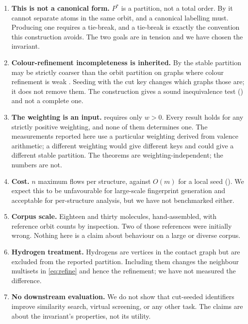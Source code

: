 \documentclass[11pt,twocolumn,a4paper]{article}
\theoremstyle{crthm}
\theoremstyle{definition}
\theoremstyle{remark}
\newcommand{\wt}{w}
\begin{document}
\begin{enumerate}[label=\textbf{L\arabic*.},leftmargin=2.8em,itemsep=4pt]

\item \textbf{This is not a canonical form.} $P^{*}$ is a partition, not a
total order. By  it cannot separate atoms in the
same orbit, and a canonical labelling must. Producing one requires a
tie-break, and a tie-break is exactly the convention this construction
avoids. The two goals are in tension and we have chosen the invariant.

\item \textbf{Colour-refinement incompleteness is inherited.} By
 the stable partition may be strictly coarser than
the orbit partition on graphs where colour refinement is weak
\citep{cai1992}. Seeding with the cut key changes which graphs those are;
it does not remove them. The construction gives a sound inequivalence test
() and not a complete one.

\item \textbf{The weighting is an input.}  requires only
$\wt>0$. Every result holds for any strictly positive weighting, and none
of them determines one. The measurements reported here use a particular
weighting derived from valence arithmetic; a different weighting would
give different keys and could give a different stable partition. The
theorems are weighting-independent; the numbers are not.

\item \textbf{Cost.} $n$ maximum flows per structure, against $O(m)$ for a
local seed (). We expect this to be unfavourable for
large-scale fingerprint generation and acceptable for per-structure
analysis, but we have not benchmarked either.

\item \textbf{Corpus scale.} Eighteen and thirty molecules, hand-assembled,
with reference orbit counts by inspection. Two of those references were
initially wrong. Nothing here is a claim about behaviour on a large or
diverse corpus.

\item \textbf{Hydrogen treatment.} Hydrogens are vertices in the contact
graph but are excluded from the reported partition. Including them changes
the neighbour multisets in \eqref{eq:refine} and hence the refinement; we
have not measured the difference.

\item \textbf{No downstream evaluation.} We do not show that cut-seeded
identifiers improve similarity search, virtual screening, or any other
task. The claims are about the invariant's properties, not its utility.
\end{enumerate}
\end{document}
